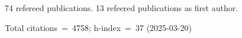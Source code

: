 74 refereed publications. 13 refeered publications as first author.

Total citations~=~4758; h-index~=~37 (2025-03-20)